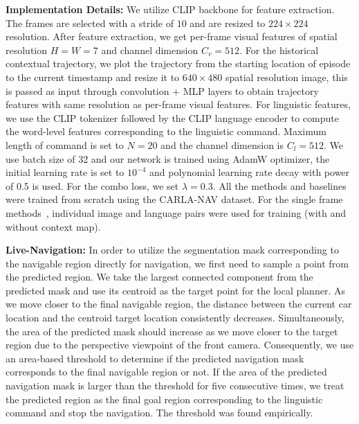 \documentclass[letterpaper, 10 pt, conference]{ieeeconf}  %
\begin{document}
\textbf{Implementation Details: }We utilize CLIP backbone \cite{Radford2021LearningTV} for feature extraction. The frames are selected with a stride of $10$ and are resized to $224 \times 224$ resolution. After feature extraction, we get per-frame visual features of spatial resolution $H=W=7$ and channel dimension $C_v=512$. For the historical contextual trajectory, we plot the trajectory from the starting location of episode to the current timestamp and resize it to $640 \times 480$ spatial resolution image, this is passed as input through convolution + MLP layers to obtain trajectory features with same resolution as per-frame visual features. For linguistic features, we use the CLIP tokenizer followed by the CLIP language encoder to compute the word-level features corresponding to the linguistic command. Maximum length of command is set to $N=20$ and the channel dimension is $C_l=512$. We use batch size of 32 and our network is trained using AdamW \cite{loshchilov2017decoupled} optimizer, the initial learning rate is set to $10^{-4}$ and polynomial learning rate decay with power of 0.5 is used. For the combo loss, we set $\lambda = 0.3$. All the methods and baselines were trained from scratch using the CARLA-NAV dataset. For the single frame methods~\cite{Rufus_2021}, individual image and language pairs were used for training (with and without context map).  

\textbf{Live-Navigation: }In order to utilize the segmentation mask corresponding to the navigable region directly for navigation, we first need to sample a point from the predicted region. We take the largest connected component from the predicted mask and use its centroid as the target point for the local planner. As we move closer to the final navigable region, the distance between the current car location and the centroid target location consistently decreases. Simultaneously, the area of the predicted mask should increase as we move closer to the target region due to the perspective viewpoint of the front camera. Consequently, we use an area-based threshold to determine if the predicted navigation mask corresponds to the final navigable region or not. If the area of the predicted navigation mask is larger than the threshold for five consecutive times, we treat the predicted region as the final goal region corresponding to the linguistic command and stop the navigation. The threshold was found empirically.
\end{document}
